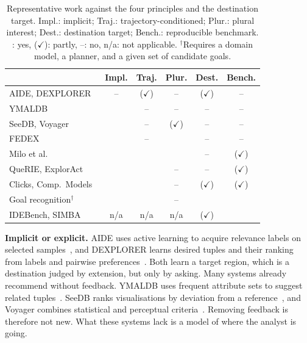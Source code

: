 \documentclass[sigconf]{acmart}
\newcommand{\yes}{\checkmark}
\newcommand{\partly}{($\checkmark$)}
\newcommand{\no}{--}
\newcommand{\na}{n/a}
\begin{document}
\begin{table}[t]
\caption{Representative work against the four principles and the destination target. Impl.: implicit; Traj.: trajectory-conditioned; Plur.: plural interest; Dest.: destination target; Bench.: reproducible benchmark. \yes: yes, \partly: partly, \no: no, \na: not applicable. $^{\dagger}$Requires a domain model, a planner, and a given set of candidate goals.}
\label{tab:positioning}
\small
\setlength{\tabcolsep}{4pt}
\begin{tabular}{@{}lccccc@{}}
\toprule
 & Impl. & Traj. & Plur. & Dest. & Bench. \\
\midrule
AIDE, DEXPLORER~\cite{dimitriadouAIDEActiveLearningBased2016,qinRankingDesiredTuples2021} & \no & \partly & \no & \partly & \no \\
YMALDB~\cite{drosouYmaldbExploringRelational2013} & \yes & \no & \no & \no & \no \\
SeeDB, Voyager~\cite{vartakSeedbEfficientDatadriven2015,wongsuphasawat2016voyager} & \yes & \no & \partly & \no & \no \\
FEDEX~\cite{deutchFEDEXExplainabilityFramework2022} & \yes & \no & \yes & \no & \no \\
Milo et al.~\cite{somechPredictingWhatInteresting2019} & \yes & \yes & \yes & \no & \partly \\
QueRIE, ExplorAct~\cite{eirinakiQuerieCollaborativeDatabase2013,dezoysa2025exploract} & \yes & \yes & \no & \no & \partly \\
Clicks, Comp.\ Models~\cite{ottley2019clicks,monadjemi2021competing} & \yes & \yes & \no & \partly & \partly \\
Goal recognition$^{\dagger}$~\cite{ramirezPlanRecognitionPlanning2009,kerenGoalRecognitionDesign2014} & \yes & \yes & \no & \yes & \yes \\
IDEBench, SIMBA~\cite{eichmannIDEBenchBenchmarkInteractive2020,purichAdaptiveBenchmarkModeling2025} & \na & \na & \na & \partly & \yes \\
\bottomrule
\end{tabular}
\end{table}

\textbf{Implicit or explicit.}
AIDE uses active learning to acquire relevance labels on selected samples~\cite{dimitriadouAIDEActiveLearningBased2016}, and DEXPLORER learns desired tuples and their ranking from labels and pairwise preferences~\cite{qinRankingDesiredTuples2021}. Both learn a target region, which is a destination judged by extension, but only by asking. Many systems already recommend without feedback. YMALDB uses frequent attribute sets to suggest related tuples~\cite{drosouYmaldbExploringRelational2013}. SeeDB ranks visualisations by deviation from a reference~\cite{vartakSeedbEfficientDatadriven2015}, and Voyager combines statistical and perceptual criteria~\cite{wongsuphasawat2016voyager}. Removing feedback is therefore not new. What these systems lack is a model of where the analyst is going.
\end{document}
